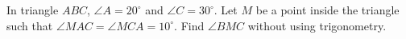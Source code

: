 In triangle $ABC$, $\angle A=20^\circ$ and $\angle C=30^\circ$. Let $M$ be a point inside the triangle such that $\angle MAC=\angle MCA=10^\circ$. Find $\angle BMC$ without using trigonometry.

